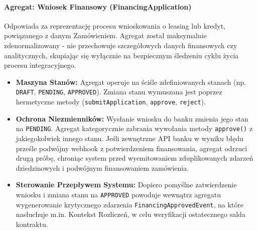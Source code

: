 \paragraph{Agregat: Wniosek Finansowy (FinancingApplication)}
Odpowiada za reprezentację procesu wnioskowania o leasing lub kredyt, powiązanego z danym Zamówieniem. Agregat został maksymalnie zdenormalizowany - nie przechowuje szczegółowych danych finansowych czy analitycznych, skupiając się wyłącznie na bezpiecznym śledzeniu cyklu życia procesu integracyjnego.
\begin{itemize}
    \item \textbf{Maszyna Stanów:} Agregat operuje na ściśle zdefiniowanych stanach (np. \texttt{DRAFT}, \texttt{PENDING}, \texttt{APPROVED}). Zmiana stanu wymuszana jest poprzez hermetyczne metody (\linebreak \texttt{submitApplication}, \texttt{approve}, \texttt{reject}).
    \item \textbf{Ochrona Niezmienników:} Wysłanie wniosku do banku zmienia jego stan na \texttt{PENDING}. Agregat kategorycznie zabrania wywołania metody \texttt{approve()} z jakiegokolwiek innego stanu. Jeśli zewnętrzne API banku w wyniku błędu prześle podwójny webhook z potwierdzeniem finansowania, agregat odrzuci drugą próbę, chroniąc system przed wyemitowaniem zduplikowanych zdarzeń dziedzinowych i podwójnym finansowaniem zamówienia.
    \item \textbf{Sterowanie Przepływem Systemu:} Dopiero pomyślne zatwierdzenie wniosku i zmiana stanu na \texttt{APPROVED} powoduje wewnątrz agregatu wygenerowanie krytycznego zdarzenia \linebreak \texttt{FinancingApprovedEvent}, na które nasłuchuje m.in. Kontekst Rozliczeń, w celu weryfikacji ostatecznego salda kontraktu.
\end{itemize}